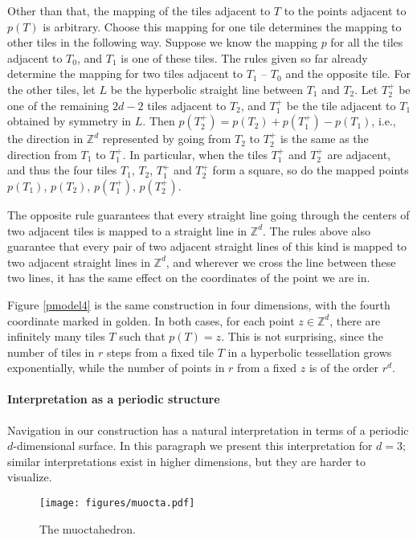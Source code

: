 \documentclass{article}
\begin{document}
Other than that, the mapping of the tiles adjacent to $T$ to the points adjacent to $p(T)$ is arbitrary. Choose this mapping
for one tile determines the mapping to other tiles in the following way. Suppose we know the mapping $p$ for all the
tiles adjacent to $T_0$, and $T_1$ is one of these tiles. The rules given so far already determine the mapping for two tiles
adjacent to $T_1$ -- $T_0$ and the opposite tile. For the other tiles, let $L$ be the hyperbolic straight line between $T_1$ and
$T_2$. Let $T_2^+$ be one of the remaining $2d-2$ tiles adjacent to $T_2$, and $T_1^+$ be the tile adjacent to $T_1$ obtained
by symmetry in $L$. Then $p(T_2^+) = p(T_2) + p(T_1^+) - p(T_1)$, i.e., the direction in $\mathbb{Z}^d$ represented by 
going from $T_2$ to $T_2^+$ is the same as the direction from $T_1$ to $T_1^+$. In particular, when the tiles $T_1^+$ and $T_2^+$
are adjacent, and thus the four tiles $T_1$, $T_2$, $T_1^+$ and $T_2^+$ form a square, so do the mapped points $p(T_1)$,
$p(T_2)$, $p(T_1^+)$, $p(T_2^+)$.

The opposite rule guarantees that every straight line going through the centers of two adjacent tiles is mapped to a straight
line in $\mathbb{Z}^d$. The rules above also guarantee that every pair of two adjacent straight lines of this kind is mapped to
two adjacent straight lines in $\mathbb{Z}^d$, and wherever we cross the line between these two lines, it has the same effect
on the coordinates of the point we are in.

Figure \ref{pmodel4} is the same construction in four dimensions, with the fourth coordinate marked in golden.
In both cases, for each point $z \in \mathbb{Z}^d$, there are infinitely many tiles $T$ such that $p(T)=z$. This is not surprising,
since the number of tiles in $r$ steps from a fixed tile $T$ in a hyperbolic tessellation grows exponentially, while the number of points in $r$
from a fixed $z$ is of the order $r^d$.

\paragraph{Interpretation as a periodic structure}
Navigation in our construction has a natural interpretation in terms of a periodic $d$-dimensional surface. In this paragraph
we present this interpretation for $d=3$; similar interpretations exist in higher dimensions, but they are harder to visualize.

\begin{figure}
\texttt{[image: figures/muocta.pdf]}
\caption{The muoctahedron.\label{muocta}}
\end{figure}
\end{document}
